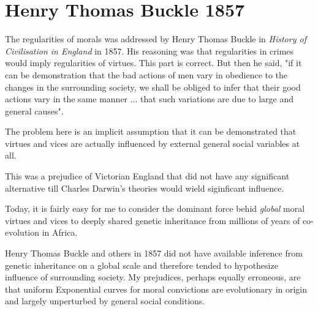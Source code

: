 \documentclass{amsart}
\author{Zulfikar Moinuddin Ahmed}
\date{\today}
\begin{document}
\maketitle

\section{Henry Thomas Buckle 1857}

The regularities of morals was addressed by Henry Thomas Buckle in {\em History of Civilisation in England} in 1857.  His reasoning was that regularities in crimes would imply regularities of virtues.  This part is correct.  But then he said, "if it can be demonstration that the bad actions of men vary in obedience to the changes in the surrounding society, we shall be obliged to infer  that their good actions vary in the same manner ... that such variations are due to large and general causes".

The problem here is an implicit assumption that it can be demonstrated that virtues and vices are actually influenced by external general social variables at all.  

This was a prejudice of Victorian England that did not have any significant alternative till Charles Darwin's theories would wield siginficant influence.  

Today, it is fairly easy for me to consider the dominant force behid {\em global} moral virtues and vices to deeply shared genetic inheritance from millions of years of co-evolution in Africa.  

Henry Thomas Buckle and others in 1857 did not have available inference from genetic inheritance on a global scale and therefore tended to hypothesize influence of surrounding society.  My prejudices, perhaps equally erroneous, are that uniform Exponential curves for moral convictions are evolutionary in origin and largely unperturbed by general social conditions.
\end{document}
